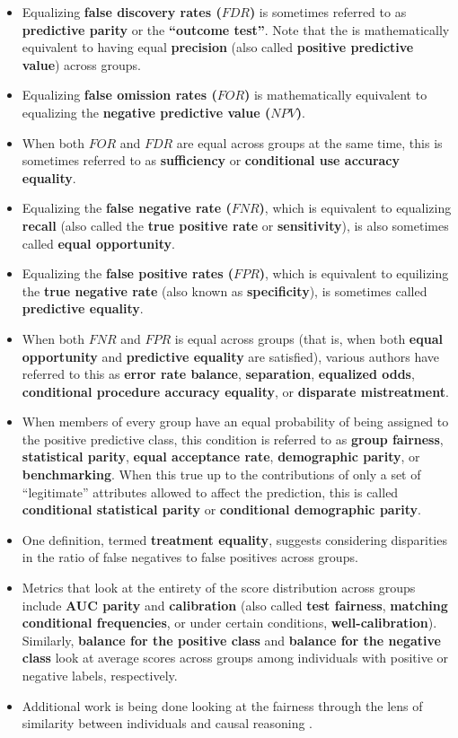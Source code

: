 \documentclass[]{krantz}
\begin{document}
\begin{itemize}
\item
  Equalizing \textbf{false discovery rates (\(FDR\))} is sometimes
  referred to as \textbf{predictive parity} or the \textbf{``outcome
  test''}. Note that the is mathematically equivalent to having equal
  \textbf{precision} (also called \textbf{positive predictive value})
  across groups.
\item
  Equalizing \textbf{false omission rates (\(FOR\))} is mathematically
  equivalent to equalizing the \textbf{negative predictive value
  (\(NPV\))}.
\item
  When both \(FOR\) and \(FDR\) are equal across groups at the same
  time, this is sometimes referred to as \textbf{sufficiency} or
  \textbf{conditional use accuracy equality}.
\item
  Equalizing the \textbf{false negative rate (\(FNR\))}, which is
  equivalent to equalizing \textbf{recall} (also called the \textbf{true
  positive rate} or \textbf{sensitivity}), is also sometimes called
  \textbf{equal opportunity}.
\item
  Equalizing the \textbf{false positive rates (\(FPR\))}, which is
  equivalent to equilizing the \textbf{true negative rate} (also known
  as \textbf{specificity}), is sometimes called \textbf{predictive
  equality}.
\item
  When both \(FNR\) and \(FPR\) is equal across groups (that is, when
  both \textbf{equal opportunity} and \textbf{predictive equality} are
  satisfied), various authors have referred to this as \textbf{error
  rate balance}, \textbf{separation}, \textbf{equalized odds},
  \textbf{conditional procedure accuracy equality}, or \textbf{disparate
  mistreatment}.
\item
  When members of every group have an equal probability of being
  assigned to the positive predictive class, this condition is referred
  to as \textbf{group fairness}, \textbf{statistical parity},
  \textbf{equal acceptance rate}, \textbf{demographic parity}, or
  \textbf{benchmarking}. When this true up to the contributions of only
  a set of ``legitimate'' attributes allowed to affect the prediction,
  this is called \textbf{conditional statistical parity} or
  \textbf{conditional demographic parity}.
\item
  One definition, termed \textbf{treatment equality}, suggests
  considering disparities in the ratio of false negatives to false
  positives across groups.
\item
  Metrics that look at the entirety of the score distribution across
  groups include \textbf{AUC parity} and \textbf{calibration} (also
  called \textbf{test fairness}, \textbf{matching conditional
  frequencies}, or under certain conditions, \textbf{well-calibration}).
  Similarly, \textbf{balance for the positive class} and \textbf{balance
  for the negative class} look at average scores across groups among
  individuals with positive or negative labels, respectively.
\item
  Additional work is being done looking at the fairness through the lens
  of similarity between individuals \citep{dwork2012, zemel2013} and
  causal reasoning \citep{kilbertus2017, kusner2017}.
\end{itemize}
\end{document}
